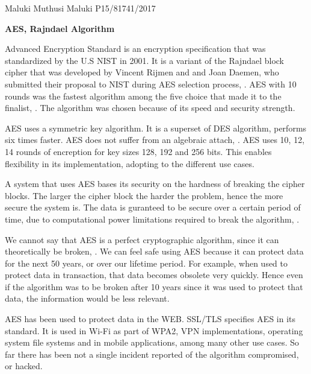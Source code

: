 \documentclass{article}
\begin{document}
Maluki Muthusi Maluki
\newline
P15/81741/2017

\begin{center}
    \textbf{AES, Rajndael Algorithm}
\end{center}

Advanced Encryption Standard is an encryption specification that was standardized by the U.S NIST in 2001. It is a variant of the Rajndael block cipher that was developed by Vincent Rijmen and and Joan Daemen, who submitted their proposal to NIST during AES selection process, \citep{Daemen2002}. AES with 10 rounds was the fastest algorithm among the five choice that made it to the finalist, \citep[p.~9]{Schneier2000}. The algorithm was chosen because of its speed and security strength.

AES uses a symmetric key algorithm. It is a superset of DES algorithm, performs six times faster. AES does not suffer from an algebraic attach, \citep{ferguson}. AES uses 10, 12, 14 rounds of encreption for key sizes 128, 192 and 256 bits. This enables flexibility in its implementation, adopting to the different use cases.

A system that uses AES bases its security on the hardness of breaking the cipher  blocks. The larger the cipher block the harder the problem, hence the more secure the system is. The data is guranteed to be secure over a certain period of time, due to computational power limitations required to break the algorithm, \citep{website:GeorgeOu}.

We cannot say that AES is a perfect cryptographic algorithm, since it can theoretically be broken, \citep{Schneier2000}. We can feel safe using AES because it can protect data for the next 50 years, or over our lifetime period. For example, when used to protect data in transaction, that data becomes obsolete very quickly. Hence even if the algorithm was to be broken after 10 years since it was used to protect that data, the information would be less relevant.

AES has been used to protect data in the WEB. SSL/TLS specifies AES in its standard. It is used in Wi-Fi as part of WPA2, VPN implementations, operating system file systems and in mobile applications, among many other use cases. So far there has been not a single incident reported of the algorithm compromised, or hacked.




\end{document}
